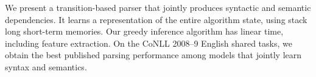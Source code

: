 We present a transition-based parser that jointly produces syntactic and semantic dependencies. It learns a representation of the entire algorithm state, using stack long short-term memories. Our greedy inference algorithm has linear time, including feature extraction. On the CoNLL 2008--9 English shared tasks, we obtain the best published parsing performance among models that jointly learn syntax and semantics.
